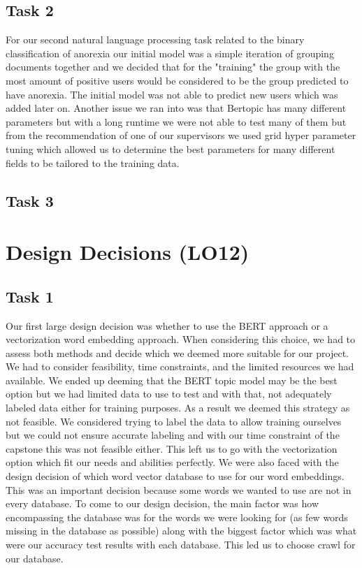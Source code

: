 \documentclass{article}
\begin{document}
\subsection{Task 2}

For our second natural language processing task related to the binary classification of anorexia our initial model was a simple iteration of grouping documents together and we decided that for the "training" the group with the most amount of positive users would be considered to be the group predicted to have anorexia. The initial model was not able to predict new users which was added later on. Another issue we ran into was that Bertopic has many different parameters but with a long runtime we were not able to test many of them but from the recommendation of one of our supervisors we used grid hyper parameter tuning which allowed us to determine the best parameters for many different fields to be tailored to the training data.

\subsection{Task 3}



\section{Design Decisions (LO12)}


\subsection{Task 1}
Our first large design decision was whether to use the BERT approach or a vectorization word embedding approach. When considering this choice, we had to assess both methods and decide which we deemed more suitable for our project. We had to consider feasibility, time constraints, and the limited resources we had available. We ended up deeming that the BERT topic model may be the best option but we had limited data to use to test and with that, not adequately labeled data either for training purposes. As a result we deemed this strategy as not feasible. We considered trying to label the data to allow training ourselves but we could not ensure accurate labeling and with our time constraint of the capstone this was not feasible either. This left us to go with the vectorization option which fit our needs and abilities perfectly. We were also faced with the design decision of which word vector database to use for our word embeddings. This was an important decision because some words we wanted to use are not in every database. To come to our design decision, the main factor was how encompassing the database was for the words we were looking for (as few words missing in the database as possible) along with the biggest factor which was what were our accuracy test results with each database. This led us to choose crawl for our database. 
\end{document}
